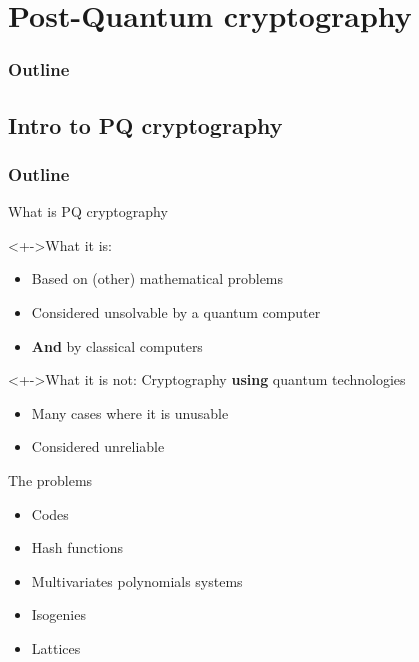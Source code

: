 \documentclass{beamer}
\begin{document}
\section{Post-Quantum cryptography}
\begin{frame}
  \frametitle{Outline}
  \tableofcontents[currentsection]
\end{frame}

\subsection{Intro to PQ cryptography}
\begin{frame}
  \frametitle{Outline}
\end{frame}

\begin{frame}{What is PQ cryptography}
	\begin{block}<+->{What it is:}
		\begin{itemize}
			\item Based on (other) mathematical problems
			\item Considered unsolvable by a quantum computer
			\item<+-> \textbf{And} by classical computers
		\end{itemize}
	\end{block}

	\begin{block}<+->{What it is not:}
		Cryptography \textbf{using} quantum technologies
		\begin{itemize}
			\item Many cases where it is unusable
			\item Considered unreliable
		\end{itemize}
	\end{block}
\end{frame}

\begin{frame}{The problems}
	\begin{itemize}
		\item Codes
		\item Hash functions
		\item Multivariates polynomials systems
		\item Isogenies
		\item { Lattices}
	\end{itemize}
\end{frame}
\end{document}
